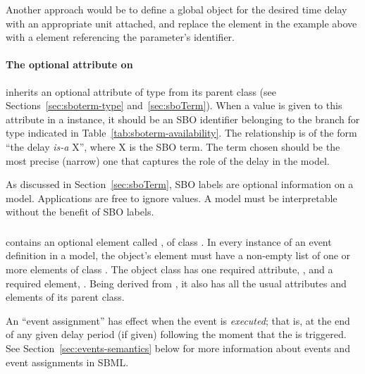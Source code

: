 Another approach would be to define a global \Parameter object for
the desired time delay with an appropriate unit attached, and
replace the  element in the example above with a
 element referencing the parameter's identifier.


\paragraph{The optional  attribute on }
\label{sec:delay-sboterm}

\Delay  inherits an optional 
attribute of type  from its parent
class \SBase (see Sections~\ref{sec:sboterm-type}
and~\ref{sec:sboTerm}).  When a value is given to this
attribute in a  \Delay instance, it should be an
SBO identifier belonging to the branch for type  \Delay
indicated in Table~\ref{tab:sboterm-availability}.  The relationship is
of the form ``the delay \emph{is-a} X'', where X is
the SBO term.  The term chosen should be the most precise (narrow)
one that captures the role of the delay  in the model.

As discussed in Section~\ref{sec:sboTerm}, SBO labels are optional
information on a model.  Applications are free to ignore
 values.  A model must be interpretable without the
benefit of SBO labels.



\subsubsection{}
\label{sec:eventassignment}
\label{sec:listofeventassignments}

\Event contains an optional element called
, of class \ListOfEventAssignments.
In every instance of an event definition in a model, the object's
 element must have a non-empty list
of one or more  elements of class
\EventAssignment.  The object class \EventAssignment has one
required attribute, , and a required element,
.  Being derived from \SBase, it also has all the
usual attributes and elements of its parent class.

An ``event assignment'' has effect when the event is
\emph{executed}; that is, at the end of any given delay period (if
given) following the moment that the \Event is triggered.  See
Section~\ref{sec:events-semantics} below for more information
about events and event assignments in SBML.


